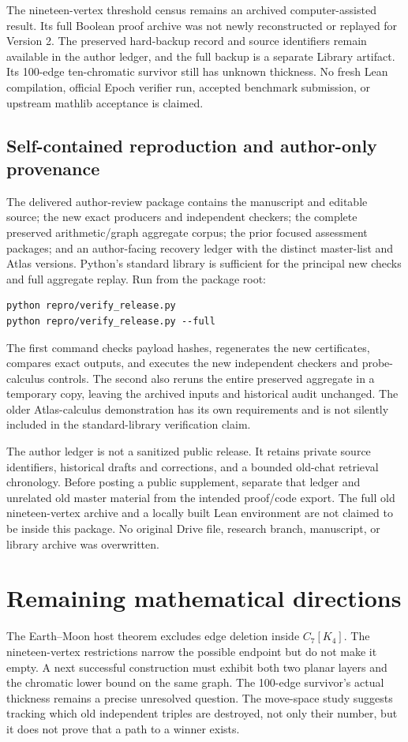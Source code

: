\documentclass[11pt,letterpaper]{article}
\theoremstyle{definition}
\theoremstyle{remark}\newtheorem{remark}[theorem]{Remark}
\begin{document}
The nineteen-vertex threshold census remains an archived computer-assisted result. Its full Boolean proof archive was not newly reconstructed or replayed for Version 2. The preserved hard-backup record and source identifiers remain available in the author ledger, and the full backup is a separate Library artifact. Its 100-edge ten-chromatic survivor still has unknown thickness. No fresh Lean compilation, official Epoch verifier run, accepted benchmark submission, or upstream mathlib acceptance is claimed.

\subsection{Self-contained reproduction and author-only provenance}
The delivered author-review package contains the manuscript and editable source; the new exact producers and independent checkers; the complete preserved arithmetic/graph aggregate corpus; the prior focused assessment packages; and an author-facing recovery ledger with the distinct master-list and Atlas versions. Python's standard library is sufficient for the principal new checks and full aggregate replay. Run from the package root:
\begin{lstlisting}
python repro/verify_release.py
python repro/verify_release.py --full
\end{lstlisting}
The first command checks payload hashes, regenerates the new certificates, compares exact outputs, and executes the new independent checkers and probe-calculus controls. The second also reruns the entire preserved aggregate in a temporary copy, leaving the archived inputs and historical audit unchanged. The older Atlas-calculus demonstration has its own requirements and is not silently included in the standard-library verification claim.

The author ledger is not a sanitized public release. It retains private source identifiers, historical drafts and corrections, and a bounded old-chat retrieval chronology. Before posting a public supplement, separate that ledger and unrelated old master material from the intended proof/code export. The full old nineteen-vertex archive and a locally built Lean environment are not claimed to be inside this package. No original Drive file, research branch, manuscript, or library archive was overwritten.

\section{Remaining mathematical directions}
The Earth--Moon host theorem excludes edge deletion inside $C_7[K_4]$. The nineteen-vertex restrictions narrow the possible endpoint but do not make it empty. A next successful construction must exhibit both two planar layers and the chromatic lower bound on the same graph. The 100-edge survivor's actual thickness remains a precise unresolved question. The move-space study suggests tracking which old independent triples are destroyed, not only their number, but it does not prove that a path to a winner exists.
\end{document}
